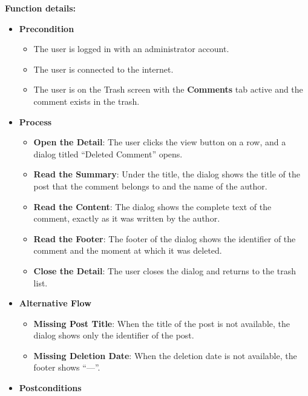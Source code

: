 \textbf{Function details:}
\begin{itemize}[leftmargin=1.6em,topsep=4pt,itemsep=3pt,parsep=0pt,label=$\bullet$]
    \item \textbf{Precondition}
        \begin{itemize}[leftmargin=2.2em,topsep=2pt,itemsep=3pt,parsep=0pt,label=$\circ$]
            \item The user is logged in with an administrator account.
            \item The user is connected to the internet.
            \item The user is on the Trash screen with the \textbf{Comments} tab active and the comment exists in the trash.
        \end{itemize}
    \item \textbf{Process}
        \begin{itemize}[leftmargin=2.2em,topsep=2pt,itemsep=3pt,parsep=0pt,label=$\circ$]
            \item \textbf{Open the Detail}: The user clicks the view button on a row, and a dialog titled ``Deleted Comment'' opens.
            \item \textbf{Read the Summary}: Under the title, the dialog shows the title of the post that the comment belongs to and the name of the author.
            \item \textbf{Read the Content}: The dialog shows the complete text of the comment, exactly as it was written by the author.
            \item \textbf{Read the Footer}: The footer of the dialog shows the identifier of the comment and the moment at which it was deleted.
            \item \textbf{Close the Detail}: The user closes the dialog and returns to the trash list.
        \end{itemize}
    \item \textbf{Alternative Flow}
        \begin{itemize}[leftmargin=2.2em,topsep=2pt,itemsep=3pt,parsep=0pt,label=$\circ$]
            \item \textbf{Missing Post Title}: When the title of the post is not available, the dialog shows only the identifier of the post.
            \item \textbf{Missing Deletion Date}: When the deletion date is not available, the footer shows ``---''.
        \end{itemize}
    \item \textbf{Postconditions}

\end{itemize}
